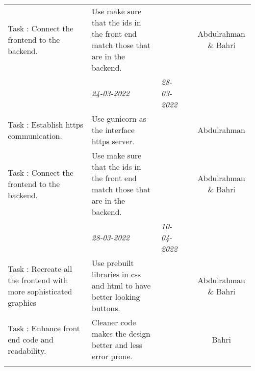 \begin{center}
\begin{small}
\begin{xltabular}{\textwidth}{ p{3cm} p{5cm} X X c }
			Task \thesubcounter: 
			Connect the frontend to the backend.
			& Use make sure that the ids in the front end match those that are 
			in the backend.
			& & & Abdulrahman \& Bahri\\
			
			\addlinespace
			
			\addlinespace
			& \emph{24-03-2022} & \emph{28-03-2022} & 
			\\ \addlinespace
			
			Task \thesubcounter: 
			Establish https communication.
			& Use gunicorn as the interface https server.
			& & & Abdulrahman \\
			
			Task \thesubcounter: 
			Connect the frontend to the backend.
			& Use make sure that the ids in the front end match those that are 
			in the backend.
			& & & Abdulrahman \& Bahri\\
			
			\addlinespace
			
			
                        \addlinespace
			
			\addlinespace
			& \emph{28-03-2022} & \emph{10-04-2022} & 
			\\ \addlinespace
			
			Task \thesubcounter: 
			Recreate all the frontend with more sophisticated graphics
			& Use prebuilt libraries in css and html to have better looking 
			buttons.
			& & & Abdulrahman \& Bahri\\
			
			Task \thesubcounter: 
			Enhance front end code and readability.
			& Cleaner code makes the design better and less error prone.
			& & & Bahri\\
			
			\addlinespace
			
			\bottomrule
		\end{xltabular}
	\end{small}
\end{center}
